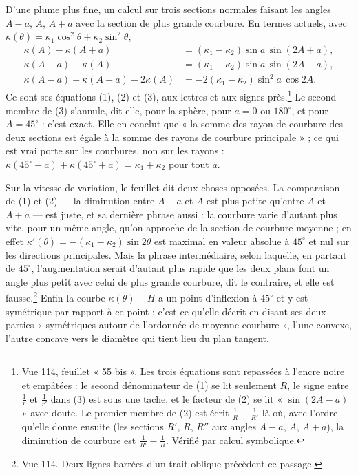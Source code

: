 \documentclass[11pt,a4paper]{article}
\begin{document}
D'une plume plus fine, un calcul sur trois sections normales faisant les angles
$A - a$, $A$, $A + a$ avec la section de plus grande courbure. En termes
actuels, avec $\kappa(\theta) = \kappa_1\cos^2\theta + \kappa_2\sin^2\theta$,
\begin{align*}
\kappa(A) - \kappa(A+a) &= (\kappa_1-\kappa_2)\sin a\,\sin(2A+a), \\
\kappa(A-a) - \kappa(A) &= (\kappa_1-\kappa_2)\sin a\,\sin(2A-a), \\
\kappa(A-a) + \kappa(A+a) - 2\kappa(A) &= -2(\kappa_1-\kappa_2)\sin^2 a\,\cos 2A .
\end{align*}
Ce sont ses équations (1), (2) et (3), aux lettres et aux signes
près.\footnote{Vue 114, feuillet « 55 bis ». Les trois équations sont repassées
à l'encre noire et empâtées : le second dénominateur de (1) se lit seulement
$R$, le signe entre $\frac1r$ et $\frac1{r'}$ dans (3) est sous une tache, et le
facteur de (2) se lit « $\sin(2A-a)$ » avec doute. Le premier membre de (2)
est écrit $\frac1R - \frac1{R'}$ là où, avec l'ordre qu'elle donne ensuite (les
sections $R'$, $R$, $R''$ aux angles $A - a$, $A$, $A + a$), la diminution de
courbure est $\frac1{R'} - \frac1R$. Vérifié par calcul symbolique.} Le second
membre de (3) s'annule, dit-elle, pour la sphère, pour $a = 0$ ou $180^\circ$, et
pour $A = 45^\circ$ : c'est exact. Elle en conclut que « la somme des rayon de
courbure des deux sections est égale à la somme des rayons de courbure
principale » ; ce qui est vrai porte sur les courbures, non sur les rayons :
$\kappa(45^\circ - a) + \kappa(45^\circ + a) = \kappa_1 + \kappa_2$ pour tout $a$.

Sur la vitesse de variation, le feuillet dit deux choses opposées. La
comparaison de (1) et (2) — la diminution entre $A - a$ et $A$ est plus petite
qu'entre $A$ et $A + a$ — est juste, et sa dernière phrase aussi : la courbure
varie d'autant plus vite, pour un même angle, qu'on approche de la section de
courbure moyenne ; en effet $\kappa'(\theta) = -(\kappa_1-\kappa_2)\sin 2\theta$
est maximal en valeur absolue à $45^\circ$ et nul sur les directions
principales. Mais la phrase intermédiaire, selon laquelle, en partant de
$45^\circ$, l'augmentation serait d'autant plus rapide que les deux plans font un
angle plus petit avec celui de plus grande courbure, dit le contraire, et elle
est fausse.\footnote{Vue 114. Deux lignes barrées d'un trait oblique précèdent ce
passage.} Enfin la courbe $\kappa(\theta) - H$ a un point d'inflexion à
$45^\circ$ et y est symétrique par rapport à ce point ; c'est ce qu'elle
décrit en disant ses deux parties « symétriques autour de l'ordonnée de moyenne
courbure », l'une convexe, l'autre concave vers le diamètre qui tient lieu du
plan tangent.
\end{document}
